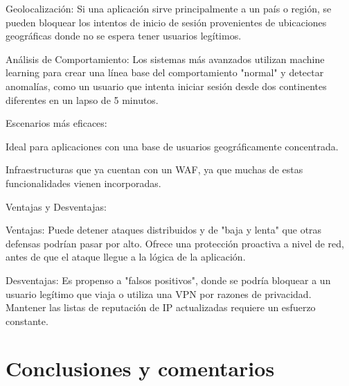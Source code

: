 \documentclass[letterpaper,12pt]{article}
\begin{document}
        Geolocalización: Si una aplicación sirve principalmente a un país o región, se pueden bloquear los intentos de inicio de sesión provenientes de ubicaciones geográficas donde no se espera tener usuarios legítimos.

        Análisis de Comportamiento: Los sistemas más avanzados utilizan machine learning para crear una línea base del comportamiento "normal" y detectar anomalías, como un usuario que intenta iniciar sesión desde dos continentes diferentes en un lapso de 5 minutos.

    Escenarios más eficaces:

        Ideal para aplicaciones con una base de usuarios geográficamente concentrada.

        Infraestructuras que ya cuentan con un WAF, ya que muchas de estas funcionalidades vienen incorporadas.

    Ventajas y Desventajas:

        Ventajas: Puede detener ataques distribuidos y de "baja y lenta" que otras defensas podrían pasar por alto. Ofrece una protección proactiva a nivel de red, antes de que el ataque llegue a la lógica de la aplicación.

        Desventajas: Es propenso a "falsos positivos", donde se podría bloquear a un usuario legítimo que viaja o utiliza una VPN por razones de privacidad. Mantener las listas de reputación de IP actualizadas requiere un esfuerzo constante.

\section*{Conclusiones y comentarios}
\end{document}
